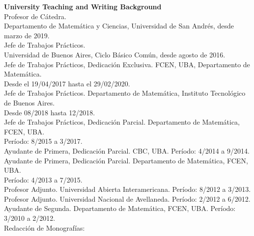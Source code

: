 \textbf{University Teaching and Writing Background}\\[6pt]
Profesor de C\'atedra.\\
Departamento de Matem\'atica y Ciencias, 
Universidad de San Andr\'es, desde marzo de 2019.\\[4pt]
Jefe de Trabajos Pr\'acticos.\\Universidad de Buenos Aires,
Ciclo B\'asico Com\'un, desde agosto de 2016.\\[4pt]
Jefe de Trabajos Pr\'acticos, Dedicaci\'on Exclusiva. FCEN, UBA, 
Departamento de Matem\'atica.\\Desde el 19/04/2017 hasta el 29/02/2020.\\[4pt]
Jefe de Trabajos Pr\'acticos. Departamento de Matem\'atica, 
Instituto Tecnol\'ogico de Buenos Aires.\\Desde 08/2018 hasta 12/2018.\\[4pt]
Jefe de Trabajos Pr\'acticos, Dedicaci\'on Parcial. Departamento de Matem\'atica, FCEN, UBA.\\
Per\'iodo: 8/2015 a 3/2017.\\[4pt]
Ayudante de Primera, Dedicaci\'on Parcial. CBC, UBA. Per\'iodo: 4/2014 a 9/2014.\\[4pt]
Ayudante de Primera, Dedicaci\'on Parcial. Departamento de Matem\'atica, FCEN, UBA.\\
Per\'iodo: 4/2013 a 7/2015.\\[4pt]
Profesor Adjunto. Universidad Abierta Interamericana.
Per\'iodo: 8/2012 a 3/2013.\\[4pt]
Profesor Adjunto. Universidad Nacional de Avellaneda.
Per\'iodo: 2/2012 a 6/2012.\\[4pt]
Ayudante de Segunda. Departamento de Matem\'atica, FCEN, UBA. Per\'iodo: 3/2010 a 2/2012.\\[6pt]
Redacci\'on de Monograf\'ias:\\[6pt]
